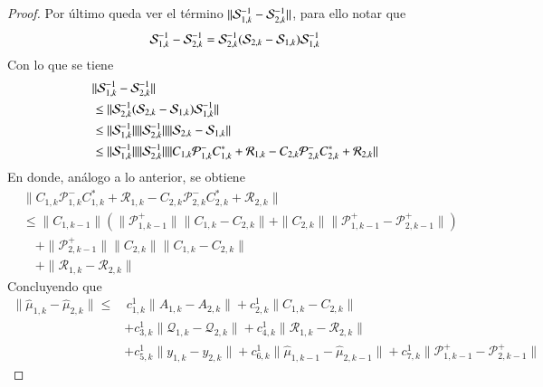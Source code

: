 \begin{proof}
	Por último queda ver el término $\| \S_{1,k}^{-1} -  \S_{2,k}^{-1}\|$, para ello notar que
	\begin{equation*}
		\S_{1,k}^{-1} -  \S_{2,k}^{-1} = \S_{2,k}^{-1} (\S_{2,k} - \S_{1,k}) \S_{1,k}^{-1}
	\end{equation*}
	Con lo que se tiene
	\begin{equation*}
		\begin{aligned}
			& \| \S_{1,k}^{-1} -  \S_{2,k}^{-1} \| \\
			& \leq  \| \S_{2,k}^{-1} (\S_{2,k} - \S_{1,k}) \S_{1,k}^{-1} \| \\
			& \leq \| \S_{1,k}^{-1} \| \|  \S_{2,k}^{-1} \| \| \S_{2,k} - \S_{1,k}\| \\
			& \leq  \| \S_{1,k}^{-1} \| \|  \S_{2,k}^{-1} \|  \| C_{1,k} \mathcal{P}_{1,k}^- C_{1,k}^* + \mathcal{R}_{1,k} - C_{2,k} \mathcal{P}_{2,k}^- C_{2,k}^* + \mathcal{R}_{2,k} \|
		\end{aligned}
	\end{equation*}
	En donde, análogo a lo anterior, se obtiene
	\begin{equation*}
		\begin{aligned}
			 & \| C_{1,k} \mathcal{P}_{1,k}^- C_{1,k}^* + \mathcal{R}_{1,k} - C_{2,k} \mathcal{P}_{2,k}^- C_{2,k}^* + \mathcal{R}_{2,k} \| \\
			 & \leq \|C_{1,k-1} \| ( \| \mathcal{P}_{1,k-1}^+ \| \|  C_{1,k} - C_{2,k} \| + \| C_{2,k} \| \| \mathcal{P}_{1,k-1}^+  - \mathcal{P}_{2,k-1}^+  \| ) \\
			 & \quad + \| \mathcal{P}_{2,k-1}^+ \| \| C_{2,k}  \| \|C_{1,k} - C_{2,k} \| \\ 
			 & \quad + \| \mathcal{R}_{1,k} - \mathcal{R}_{2,k}  \|
		\end{aligned}
	\end{equation*}
	Concluyendo que
		 \begin{equation*}
		\begin{aligned}
			\| \hat \mu_{1,k} - \hat \mu_{2,k}  \| \leq & \, c_{1,k}^1 \| A_{1, k} - A_{2, k} \| +  c_{2,k}^1 \| C_{1, k} - C_{2, k} \| \\ 
			&+ c_{3,k}^1 \| \mathcal{Q}_{1, k} - \mathcal{Q}_{2, k} \| +c_{4,k}^1 \| \mathcal{R}_{1, k} - \mathcal{R}_{2, k} \| \\
			& + c_{5,k}^1 \| y_{1,k} - y_{2,k} \| + c_{6,k}^1 \| \hat \mu_{1, k-1} - \hat \mu_{2, k-1} \| + c_{7,k}^1 \| \mathcal{P}_{1, k-1}^+ - \mathcal{P}_{2, k-1}^+ \|
		\end{aligned}
	\end{equation*}

\end{proof}
